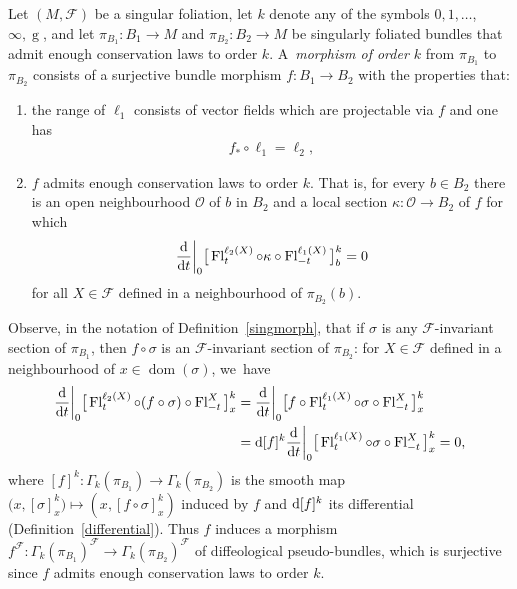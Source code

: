 \documentclass[10pt,a4paper]{amsart}
\numberwithin{equation}{section}
\def\g{\operatorname{g}}
\def\dom{\operatorname{dom}}
\def\Fl{\operatorname{Fl}}
\def\FF{{\mathcal{F}}}
\def\OO{{\mathcal{O}}}
\begin{document}
\begin{Definition}\label{singmorph}
Let $(M,\FF)$ be a singular foliation, let $k$ denote any of the symbols $0,1,\dots$, $\infty,\g$, and let $\pi_{B_{1}}\colon B_{1}\rightarrow M$ and $\pi_{B_{2}}\colon B_{2}\rightarrow M$ be singularly foliated bundles that admit enough conservation laws to order $k$. A~\textit{morphism of order $k$} from $\pi_{B_{1}}$ to $\pi_{B_{2}}$ consists of a surjective bundle morphism $f\colon B_{1}\rightarrow B_{2}$ with the properties that:
\begin{enumerate}\itemsep=0pt
\item[$(1)$] the range of $\ell_{1}$ consists of vector fields which are projectable via $f$ and one has
\begin{gather*}
f_{*}\circ\ell_{1} = \ell_{2},
\end{gather*}
\item[$(2)$] $f$ admits enough conservation laws to order $k$. That is, for every $b\in B_{2}$ there is an open neighbourhood $\OO$ of $b$ in $B_{2}$ and a local section $\kappa\colon \OO\rightarrow B_{2}$ of $f$ for which
\begin{gather*}
\frac{\rm d}{{\rm d}t}\bigg|_{0}\big[\Fl^{\ell_{2}(X)}_{t}\circ\kappa\circ\Fl^{\ell_{1}(X)}_{-t}\big]^{k}_{b} = 0
\end{gather*}
for all $X\in\FF$ defined in a neighbourhood of $\pi_{B_{2}}(b)$.
\end{enumerate}
\end{Definition}

Observe, in the notation of Definition~\ref{singmorph}, that if $\sigma$ is any $\FF$-invariant section of $\pi_{B_{1}}$, then $f\circ\sigma$ is an $\FF$-invariant section of $\pi_{B_{2}}$: for $X\in\FF$ defined in a neighbourhood of $x\in\dom(\sigma)$, we~have
\begin{align*}
\frac{\rm d}{{\rm d}t}\bigg|_{0}\big[\Fl^{\ell_{2}(X)}_{t}\circ (f\circ\sigma)\circ\Fl^{X}_{-t}\big]^{k}_{x} &
= \frac{\rm d}{{\rm d}t}\bigg|_{0}\big[f\circ\Fl^{\ell_{1}(X)}_{t}\circ\sigma\circ\Fl^{X}_{-t}\big]^{k}_{x}
\\
&= {\rm d}[f]^{k}\frac{\rm d}{{\rm d}t}\bigg|_{0}\big[\Fl^{\ell_{1}(X)}_{t}\circ\sigma\circ\Fl^{X}_{-t}\big]^{k}_{x}=0,
\end{align*}
where $[f]^{k}\colon \Gamma_{k}(\pi_{B_{1}})\rightarrow\Gamma_{k}(\pi_{B_{2}})$ is the smooth map $\big(x,[\sigma]^{k}_{x}\big)\mapsto (x,[f\circ\sigma]^{k}_{x})$ induced by $f$ and ${\rm d}[f]^{k}$ its differential (Definition~\ref{differential}). Thus $f$ induces a morphism $f^{\FF}\colon \Gamma_{k}(\pi_{B_{1}})^{\FF}\rightarrow\Gamma_{k}(\pi_{B_{2}})^{\FF}$ of diffeological pseudo-bundles, which is surjective since $f$ admits enough conservation laws to order $k$.
\end{document}
